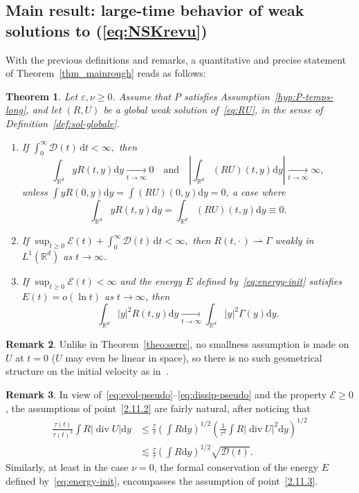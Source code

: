 \documentclass[11pt]{article}
\newtheorem{theo}{Theorem}[section]
\theoremstyle{definition}
\newtheorem{rema}[theo]{Remark}
\numberwithin{equation}{section}
\numberwithin{figure}{section}
\numberwithin{table}{section}
\DeclareMathOperator{\DIV}{div}
\newcommand*\R{\mathbb{R}}
\newcommand*\dd {\mathrm{d}}
\newcommand*\<{\left\langle}
\renewcommand*\>{\right\rangle}
\renewcommand*\le{\leqslant}
\renewcommand*\ge{\geqslant}
\newcommand*\Tend[2]{\mathop{\longrightarrow}\limits_{#1\rightarrow#2}}
\newcommand*\eps{\varepsilon}
\begin{document}
\subsection{Main result: large-time behavior of weak solutions to (\ref{eq:NSKrevu})}

With the previous definitions and remarks, a quantitative and precise statement of Theorem~\ref{thm_mainrough} reads as follows:

\goodbreak
\begin{theo}\label{theo:temps-long}
Let $\eps,\nu\ge 0$. Assume that $P$ satisfies Assumption~\ref{hyp:P-temps-long}, and let $(R,U)$ be a global weak solution of~\eqref{eq:RU}, in the sense of Definition~\ref{def:sol-globale}.
\begin{enumerate}%
\item \label{2.11.1} If $\int_0^\infty \mathcal D(t) \, \dd t < \infty,$ then
\[
\int_{\R^d} yR(t,y)\dd y\Tend t \infty 0\quad \text{and}\quad \left|\int_{\R^d} (RU)(t,y)\dd y\right|\Tend t \infty \infty,
\]
unless $\int y R(0,y)\dd y= \int (RU)(0,y)\dd y =0$, a case where
\[
\int_{\R^d} yR(t,y)\dd y=\int_{\R^d} (RU)(t,y)\dd y\equiv 0.
\]

\item \label{2.11.2} If $
\sup_{t \ge 0} \mathcal E(t) + \int_0^\infty \mathcal D(t) \, \dd t < \infty,$ then $R(t, \cdot\,) \rightharpoonup \Gamma$ weakly in $L^1(\R^d)$ as $ t \to \infty$.

\item \label{2.11.3} If $
\sup_{t \ge 0} \mathcal E(t) < \infty$ and the energy $E$ defined by~\eqref{eq:energy-init} satisfies $E(t)=o\left(\ln t\right)$ as $t\to \infty$, then
\begin{equation*}
\int_{\R^d}|y|^2R(t,y) \dd y \Tend t \infty \int_{\R^d}|y|^2 \Gamma(y) \dd y.
\end{equation*}
\end{enumerate}
\end{theo}

\begin{rema}
Unlike in Theorem~\ref{theo:serre}, no smallness assumption is made on $U$ at $t=0$ ($U$ may even be linear in space), so there is no such geometrical structure on the initial velocity as in~\cite{Serre97,Gra98}.
\end{rema}

\begin{rema}\label{rem:hyp-naturelles}
In view of~\eqref{eq:evol-pseudo}--\eqref{eq:dissip-pseudo} and the property $\mathcal E\ge 0$, the assumptions of point~\eqref{2.11.2} are fairly natural, after noticing that
\begin{align*}
\frac{\dot
\tau(t)}{\tau(t)^3} \int R \left| \DIV U\right|\dd y & \le
\frac{\dot \tau}{\tau}\left(\int R\dd y\right)^{1/2} \left(\frac{1}{\tau^4}\int R|\DIV U|^2\dd y\right)^{1/2}\\
&\lesssim \frac{\dot \tau}{\tau}\left(\int R\dd y\right)^{1/2} \sqrt{\mathcal D(t)}.
\end{align*}
Similarly, at least in the case $\nu=0$, the formal conservation of the energy $E$ defined by~\eqref{eq:energy-init}, encompasses the assumption of point~\eqref{2.11.3}.
\end{rema}
\end{document}
